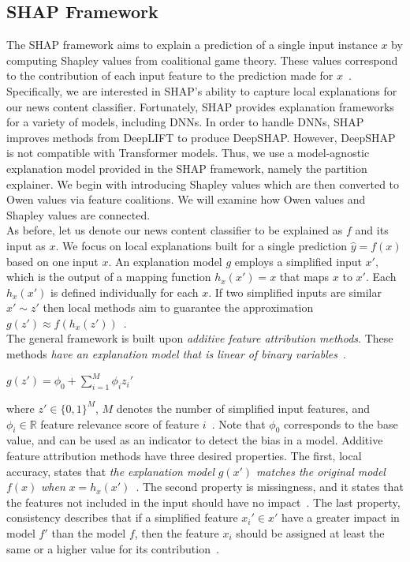 \subsection{SHAP Framework}
\label{subsec:ExplainingNewsContentModels_SHAPFramework}
The SHAP framework aims to explain a prediction of a single input instance $x$ by computing Shapley values from coalitional game theory. These values correspond to the contribution of each input feature to the prediction made for $x$~\parencite{InterpretableMachineLearning_Molnar}. Specifically, we are interested in SHAP's ability to capture local explanations
for our news content classifier. Fortunately, SHAP provides explanation frameworks for a variety of models, including DNNs. In order to handle DNNs, SHAP improves methods from DeepLIFT to produce DeepSHAP. However, DeepSHAP is not compatible with Transformer models. Thus, we use a model-agnostic explanation model provided in the SHAP framework, namely the partition explainer. We begin with introducing Shapley values which are then converted to Owen values via feature coalitions. We will examine how Owen values and Shapley values are connected.\\
As before, let us denote our news content classifier to be explained as $f$ and its input as $x$. We focus on local explanations built for a single prediction $\hat{y} = f(x)$ based on one input $x$. An explanation model $g$ employs a simplified input $x'$, which is the output of a mapping function $h_x(x') = x$ that maps $x$ to $x'$. Each $h_x(x')$ is defined individually for each $x$. If two simplified inputs are similar $x' \sim z'$ then local methods aim to guarantee the approximation $g(z') \approx f(h_x(z'))$~\parencite{AUnifiedApproach_Lundberg}.\\
The general framework is built upon \emph{additive feature attribution methods}. These methods \emph{have an explanation model that is linear of binary variables}~\parencite{AUnifiedApproach_Lundberg}.\\
\begin{center}
    $g(z') = \phi_0 + \sum\limits_{i=1}^M \phi_i z_i'$
\end{center}
where $z' \in \{0, 1\}^M$, $M$ denotes the number of simplified input features, and $\phi_i \in \mathbb{R}$ feature relevance score of feature $i$~\parencite{AUnifiedApproach_Lundberg}. Note that $\phi_0$ corresponds to the base value, and can be used as an indicator to detect the bias in a model. Additive feature attribution methods have three desired properties. The first, local accuracy, states that \emph{the explanation model} $g(x')$ \emph{matches the original model} $f(x)$ \emph{when} $x = h_x(x')$~\parencite{AUnifiedApproach_Lundberg}. The second property is missingness, and it states that the features not included in the input should have no impact~\parencite{AUnifiedApproach_Lundberg}. The last property, consistency describes that if a simplified feature $x_i' \in x'$ have a greater impact in model $f'$ than the model $f$, then the feature $x_i$ should be assigned at least the same or a higher value for its contribution~\parencite{AUnifiedApproach_Lundberg}. \\
